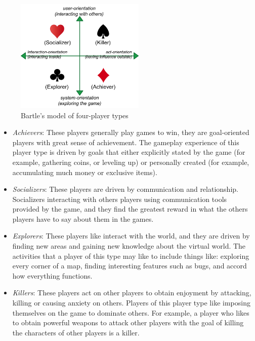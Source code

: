 \begin{figure}[htb]
 \caption{Bartle's model of four-player types}
 \label{fig:bartle-player-types}
 \centering
 \includegraphics[width=0.55\textwidth]{images/chap-general-background/bartle-player-types.png}
\end{figure}

\begin{itemize}
\item \emph{Achievers}:
These players generally play games to win, they are goal-oriented players with great sense of achievement.
The gameplay experience of this player type is driven by goals that either explicitly stated by the game (for example, gathering coins, or leveling up) or personally created (for example, accumulating much money or exclusive items).

\item  \emph{Socializers}:
These players are driven by communication and relationship. 
Socializers interacting with others players using communication tools provided by the game, and they find the greatest reward in what the others players have to say about them in the games.

\item \emph{Explorers}:
These players like interact with the world, and they are driven by finding new areas and gaining new knowledge about the virtual world.
The activities that a player of this type may like to include things like: exploring every corner of a map, finding interesting features such as bugs, and accord how everything functions.

\item \emph{Killers}:
These players act on other players to obtain enjoyment by attacking, killing or causing anxiety on others. Players of this player type like imposing themselves on the game to dominate others.
For example, a player who likes to obtain powerful weapons to attack other players with the goal of killing the characters of other players is a killer.
\end{itemize}

